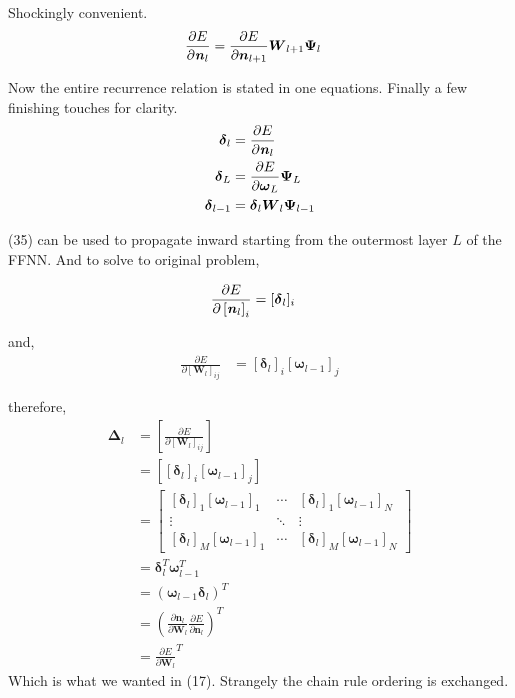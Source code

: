 \documentclass[12pt,letterpaper]{article}
\begin{document}
Shockingly convenient.
\begin{align}
\frac{\partial E}{ \partial \textbf{\textit{n}}_l } 
&= 
\frac{\partial E}{\partial \boldsymbol{n}_{l+1}}
\boldsymbol{W}_{l+1}
\boldsymbol{\Psi}_l
\end{align}

Now the entire recurrence relation is stated in one equations.  Finally a few finishing touches for clarity.
\begin{align}
\boldsymbol{\delta}_l 
&=
\frac{\partial E}{ \partial \textbf{\textit{n}}_l } \\
\boldsymbol{\delta}_L
&=
\frac{\partial E}{\partial \boldsymbol{\omega}_{L}}
\boldsymbol{\Psi}_L \\
\boldsymbol{\delta}_{l-1}
&= 
\boldsymbol{\delta}_l
\boldsymbol{W}_l
\boldsymbol{\Psi}_{l-1}
\end{align} 

(35) can be used to propagate inward starting from the outermost layer $L$ of the FFNN.  And to solve to original problem, 

\begin{align}
\frac{\partial E}{ \partial \left[ \textbf{\textit{n}}_l \right]_i }
&= 
[\boldsymbol{\delta}_l]_i
\end{align}

and,
\begin{align}
\frac{\partial E}{\partial [\boldsymbol{W}_l]_{ij}}
&=
[\boldsymbol{\delta}_l]_i
[\boldsymbol{\omega}_{l-1}]_j
\end{align}

therefore,
\begin{align}
\boldsymbol{\Delta}_l 
&= 
\left[ \frac{\partial E}{\partial [\boldsymbol{W}_{l}]_{ij}} \right] \\
&=
\left[  
[\boldsymbol{\delta}_l]_i
[\boldsymbol{\omega}_{l-1}]_j
\right] \\
&= 
\begin{bmatrix}
[\boldsymbol{\delta}_l]_1 [\boldsymbol{\omega}_{l-1}]_1 & \cdots & [\boldsymbol{\delta}_l]_1 [\boldsymbol{\omega}_{l-1}]_N \\ 
\vdots &  \ddots & \vdots\\ 
[\boldsymbol{\delta}_l]_M [\boldsymbol{\omega}_{l-1}]_1  & \cdots & [\boldsymbol{\delta}_l]_M [\boldsymbol{\omega}_{l-1}]_N
\end{bmatrix} \\
&=
\boldsymbol{\delta}_l^T
\boldsymbol{\omega}_{l-1}^T \\
&=
(\boldsymbol{\omega}_{l-1}
\boldsymbol{\delta}_l)^T \\
&= \left(
\frac{\partial \boldsymbol{n}_l}{\partial \boldsymbol{W}_l}
\frac{\partial E}{ \partial \boldsymbol{n}_l }
\right)^T \\
&=
\frac{\partial E}{\partial \boldsymbol{W}_l}^T
\end{align}
Which is what we wanted in (17).  Strangely the chain rule ordering is exchanged.
\end{document}
